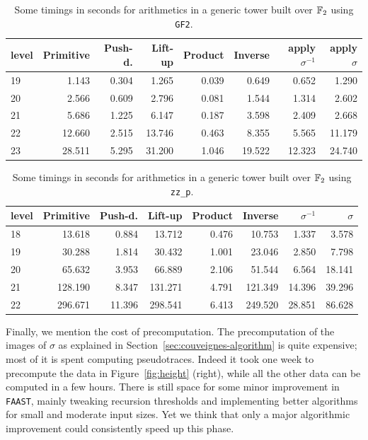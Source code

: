 \begin{table}
  \centering
  \begin{tabular}{l r r r r r r r}
    \hline
    \small level & \small Primitive & \small Push-d. & \small Lift-up & \small Product & \small Inverse & \small apply $\sigma^{-1}$ & \small apply $\sigma$ \\
    \hline
    19 &  1.143 & 0.304 &  1.265 & 0.039 &  0.649 &  0.652 &  1.290\\
    20 &  2.566 & 0.609 &  2.796 & 0.081 &  1.544 &  1.314 &  2.602\\
    21 &  5.686 & 1.225 &  6.147 & 0.187 &  3.598 &  2.409 &  2.668\\
    22 & 12.660 & 2.515 & 13.746 & 0.463 &  8.355 &  5.565 & 11.179\\
    23 & 28.511 & 5.295 & 31.200 & 1.046 & 19.522 & 12.323 & 24.740
  \end{tabular}
  \caption{Some timings in seconds for arithmetics in a generic tower built over $\mathbb{F}_2$ using \texttt{GF2}.}
  \label{tab:arith-gf2}
\end{table}

\begin{table}
  \centering
  \begin{tabular}{l r r r r r r r}
    \hline
    \small level & \small Primitive & \small Push-d. & \small Lift-up & \small Product & \small Inverse & \small $\sigma^{-1}$ & \small  $\sigma$ \\
    \hline
    18 &  13.618 &  0.884 &  13.712 & 0.476 &  10.753 &  1.337 &  3.578\\
    19 &  30.288 &  1.814 &  30.432 & 1.001 &  23.046 &  2.850 &  7.798\\
    20 &  65.632 &  3.953 &  66.889 & 2.106 &  51.544 &  6.564 & 18.141\\
    21 & 128.190 &  8.347 & 131.271 & 4.791 & 121.349 & 14.396 & 39.296\\
    22 & 296.671 & 11.396 & 298.541 & 6.413 & 249.520 & 28.851 & 86.628
  \end{tabular}
  \caption{Some timings in seconds for arithmetics in a generic tower built over $\mathbb{F}_2$ using \texttt{zz\_p}.}
  \label{tab:arith-zzp}
\end{table}


Finally, we mention the cost of precomputation. The precomputation of
the images of $\sigma$ as explained in
Section~\ref{sec:couveignes-algorithm} is quite expensive; most of it
is spent computing pseudotraces. Indeed it took one week to precompute
the data in Figure~\ref{fig:height} (right), while all the other data
can be computed in a few hours. There is still space for some minor
improvement in \texttt{FAAST}, mainly tweaking recursion thresholds
and implementing better algorithms for small and moderate input
sizes. Yet we think that only a major algorithmic improvement could
consistently speed up this phase.



%
